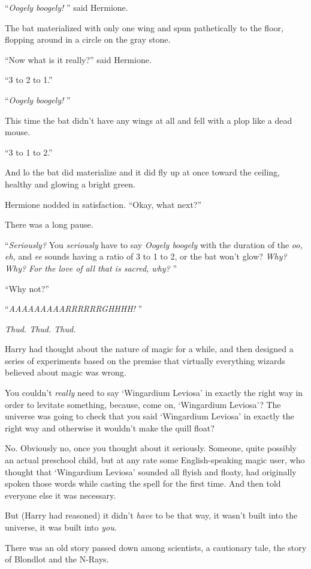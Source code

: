 ``\emph{Oogely boogely!} '' said Hermione.

The bat materialized with only one wing and spun pathetically to the
floor, flopping around in a circle on the gray stone.

``Now what is it really?'' said Hermione.

``3 to 2 to 1.''

``\emph{Oogely boogely!} ''

This time the bat didn't have any wings at all and fell with a plop like
a dead mouse.

``3 to 1 to 2.''

And lo the bat did materialize and it did fly up at once toward the
ceiling, healthy and glowing a bright green.

Hermione nodded in satisfaction. ``Okay, what next?''

There was a long pause.

``\emph{Seriously?} You \emph{seriously} have to say \emph{Oogely
boogely} with the duration of the \emph{oo,} \emph{eh,} and \emph{ee}
sounds having a ratio of 3 to 1 to 2, or the bat won't glow? \emph{Why?
Why? For the love of all that is sacred, why?} ''

``Why not?''

``\emph{AAAAAAAAARRRRRRGHHHH!} ''

\emph{Thud. Thud. Thud.}

Harry had thought about the nature of magic for a while, and then
designed a series of experiments based on the premise that virtually
everything wizards believed about magic was wrong.

You couldn't \emph{really} need to say `Wingardium Leviosa' in exactly
the right way in order to levitate something, because, come on,
`Wingardium Leviosa'? The universe was going to check that you said
`Wingardium Leviosa' in exactly the right way and otherwise it wouldn't
make the quill float?

No. Obviously no, once you thought about it seriously. Someone, quite
possibly an actual preschool child, but at any rate some
English-speaking magic user, who thought that `Wingardium Leviosa'
sounded all flyish and floaty, had originally spoken those words while
casting the spell for the first time. And then told everyone else it was
necessary.

But (Harry had reasoned) it didn't \emph{have} to be that way, it wasn't
built into the universe, it was built into \emph{you}.

There was an old story passed down among scientists, a cautionary tale,
the story of Blondlot and the N-Rays.

